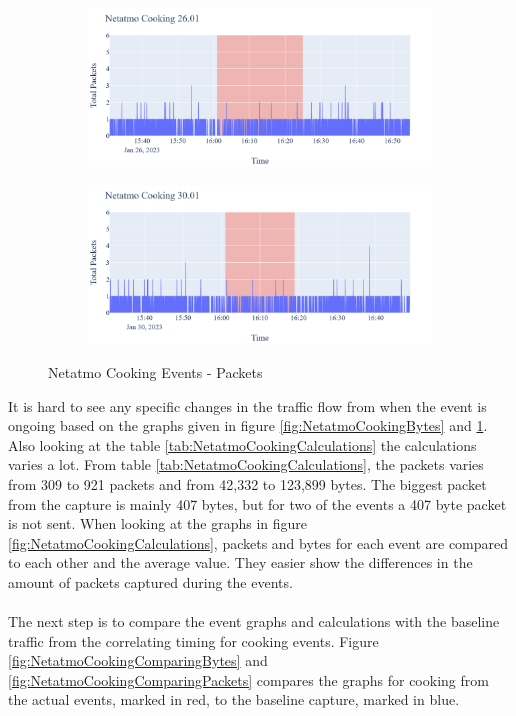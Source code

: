 \begin{figure}[H]
\begin{subfigure}[b]{0.47\textwidth}
    \end{subfigure}
    \begin{subfigure}[b]{0.47\textwidth}
        \centering
        \includegraphics[width=1.2\hsize]{figures/Netatmo_Cooking_Packets_26.01.png}
    \end{subfigure}
    \hspace{0.6cm}
    \begin{subfigure}[b]{0.47\textwidth}
        \centering
        \includegraphics[width=1.2\hsize]{figures/Netatmo_Cooking_Packets_30.01.png}
    \end{subfigure}
    \caption{Netatmo Cooking Events - Packets}
    \label{fig:NetatmoCookingPackets}
\end{figure}

It is hard to see any specific changes in the traffic flow from when the event is ongoing based on the graphs given in figure \ref{fig:NetatmoCookingBytes} and \ref{fig:NetatmoCookingPackets}. Also looking at the table \ref{tab:NetatmoCookingCalculations} the calculations varies a lot. From table \ref{tab:NetatmoCookingCalculations}, the packets varies from 309 to 921 packets and from 42,332 to 123,899 bytes. The biggest packet from the capture is mainly 407 bytes, but for two of the events a 407 byte packet is not sent. When looking at the graphs in figure \ref{fig:NetatmoCookingCalculations}, packets and bytes for each event are compared to each other and the average value. They easier show the differences in the amount of packets captured during the events. 
\\\\
The next step is to compare the event graphs and calculations with the baseline traffic from the correlating timing for cooking events. Figure \ref{fig:NetatmoCookingComparingBytes} and \ref{fig:NetatmoCookingComparingPackets} compares the graphs for cooking from the actual events, marked in red, to the baseline capture, marked in blue. 

